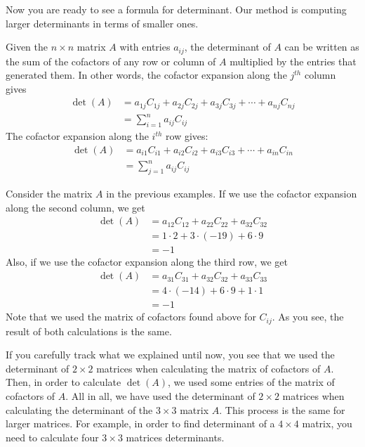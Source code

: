 \documentclass{subfile}
\begin{document}
Now you are ready to see a formula for determinant. Our method is computing larger determinants in terms of smaller ones.

	\begin{definition}
		Given the $n\times n$ matrix $A$ with entries $a_{ij}$, the determinant of $A$ can be written as the sum of the cofactors of any row or column of $A$ multiplied by the entries that generated them. In other words, the cofactor expansion along the $j^{th}$ column gives
		\begin{align*}
			\det(A)
				& = a_{1j}C_{1j} + a_{2j}C_{2j} + a_{3j}C_{3j} + \cdots + a_{nj}C_{nj}\\
				& = \sum_{i=1}^{n} a_{ij} C_{ij}
		\end{align*}
		The cofactor expansion along the $i^{th}$ row gives:
		\begin{align*}
			\det(A)
				& = a_{i1}C_{i1} + a_{i2}C_{i2} + a_{i3}C_{i3} + \cdots + a_{in}C_{in}\\
				& = \sum_{j=1}^{n} a_{ij} C_{ij}
		\end{align*}
	\end{definition}

	\begin{example}
		Consider the matrix $A$ in the previous examples. If we use the cofactor expansion along the second column, we get
		\begin{align*}
			\det(A)
				& =a_{12} C_{12} + a_{22}C_{22} + a_{32} C_{32}\\
				& = 1 \cdot 2 + 3 \cdot (-19) + 6 \cdot 9\\
				& = -1
		\end{align*}
		Also, if we use the cofactor expansion along the third row, we get
		\begin{align*}
			\det(A)
				& =a_{31} C_{31} + a_{32}C_{32} + a_{33} C_{33}\\
				& = 4 \cdot (-14) + 6 \cdot 9 + 1 \cdot 1\\
				& = -1
		\end{align*}
		Note that we used the matrix of cofactors found above for $C_{ij}$. As you see, the result of both calculations is the same.
	\end{example}

If you carefully track what we explained until now, you see that we used the determinant of $2\times 2$ matrices when calculating the matrix of cofactors of $A$. Then, in order to calculate $\det(A)$, we used some entries of the matrix of cofactors of $A$. All in all, we have used the determinant of $2\times 2$ matrices when calculating the determinant of the $3 \times 3$ matrix $A$. This process is the same for larger matrices. For example, in order to find determinant of a $4 \times 4$ matrix, you need to calculate four $3\times 3$ matrices determinants.
\end{document}
